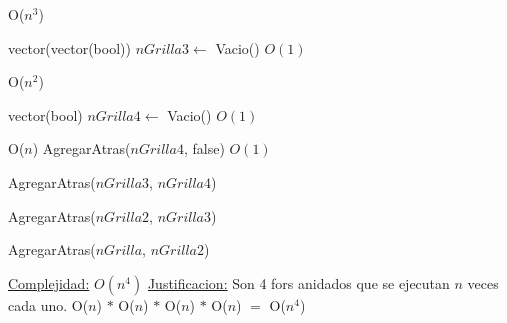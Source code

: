 \begin{Algoritmos}
\begin{algorithm}[H]
\begin{algorithmic}[1]
	  \Comment O($n^3$)
	
		\State vector(vector(bool)) $nGrilla3 \gets$ Vacio()   \Comment $O(1)$
		
		  \Comment O($n^2$)

			\State vector(bool) $nGrilla4 \gets$ Vacio() \Comment $O(1)$
			
			   \Comment O($n$)
			 	\State AgregarAtras($nGrilla4$, false) \Comment $O(1)$			 	
			 \EndFor		
			 
			 \State AgregarAtras($nGrilla3$, $nGrilla4$)
		
		\EndFor
		
		\State AgregarAtras($nGrilla2$, $nGrilla3$)
	
	\EndFor
	
	\State AgregarAtras($nGrilla$, $nGrilla2$)


\EndFor

\medskip
\Statex \underline{Complejidad:} $O(n^4)$
\Statex \underline{Justificacion:} Son 4 fors anidados que se ejecutan $n$ veces cada uno. O($n$) $*$ O($n$) $*$ O($n$) $*$ O($n$) $=$  O($n^4$)
 
\end{algorithmic}
\end{algorithm}



  
\end{Algoritmos}